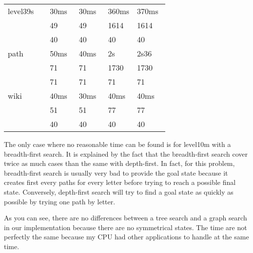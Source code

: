 \begin{enumerate}
\begin{framed}
\begin{tabular}{l|p{0.18\linewidth}|p{0.18\linewidth}|p{0.18\linewidth}|p{0.2\linewidth}}
	    \hline
	    level39s 	& 30ms			& 30ms			& 360ms			& 370ms		 	\\
			& 49			& 49			& 1614			& 1614			\\
			& 40			& 40			& 40			& 40			\\
	    \hline
	    path 	& 50ms			& 40ms			& 2s			& 2s36		 	\\
			& 71			& 71			& 1730			& 1730			\\
			& 71			& 71			& 71			& 71			\\
	    \hline
	    wiki 	& 40ms			& 30ms			& 40ms			& 40ms	 		\\
			& 51			& 51			& 77			& 77			\\
			& 40			& 40			& 40			& 40			\\
	  \end{tabular}
      \bigskip
      
      The only case where no reasonable time can be found is for level10m
      with a breadth-first search. It is explained by the fact that the
      breadth-first search cover twice as much cases than the same with
      depth-first. In fact, for this problem, breadth-first search is
      usually very bad to provide the goal state because it creates first
      every paths for every letter before trying to reach a possible final
      state. Conversely, depth-first search will try to find a goal state
      as quickly as possible by trying one path by letter. \newline

      As you can see, there are no differences between a tree search and a
      graph search in our implementation because there are no symmetrical
      states. The time are not perfectly the same because my CPU had other
      applications to handle at the same time.
	\end{framed}

\end{enumerate}
